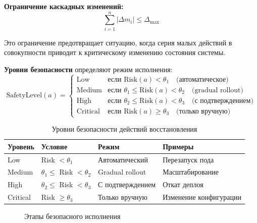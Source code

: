 \textbf{Ограничение каскадных изменений:}
\begin{equation}
\sum_{i=1}^{n} |\Delta m_i| \leq \Delta_{\max}
\label{eq:change_limit}
\end{equation}

Это ограничение предотвращает ситуацию, когда серия малых действий в совокупности приводит к критическому изменению состояния системы.

\textbf{Уровни безопасности} определяют режим исполнения:
\begin{equation}
\text{SafetyLevel}(a) = \begin{cases}
\text{Low} & \text{если } \text{Risk}(a) < \theta_1 \quad \text{(автоматическое)} \\
\text{Medium} & \text{если } \theta_1 \leq \text{Risk}(a) < \theta_2 \quad \text{(gradual rollout)} \\
\text{High} & \text{если } \theta_2 \leq \text{Risk}(a) < \theta_3 \quad \text{(с подтверждением)} \\
\text{Critical} & \text{если } \text{Risk}(a) \geq \theta_3 \quad \text{(только вручную)}
\end{cases}
\label{eq:safety_levels}
\end{equation}

\begin{table}[H]
\centering
\small

\caption{Уровни безопасности действий восстановления}
\label{tab:safety_levels}
\begin{tabular}{|>{\raggedright\arraybackslash}p{2cm}|>{\raggedright\arraybackslash}p{3cm}|>{\raggedright\arraybackslash}p{3cm}|>{\raggedright\arraybackslash}p{2.5cm}|}
\hline
Уровень & Условие & Режим & Примеры \\
\hline
Low & Risk $< \theta_1$ & Автоматический & Перезапуск пода \\
\hline
Medium & $\theta_1 \leq$ Risk $< \theta_2$ & Gradual rollout & Масштабирование \\
\hline
High & $\theta_2 \leq$ Risk $< \theta_3$ & С подтверждением & Откат деплоя \\
\hline
Critical & Risk $\geq \theta_3$ & Только вручную & Изменение конфигурации \\
\hline
\end{tabular}
\end{table}

\begin{figure}[H]
\centering
{}
\caption{Этапы безопасного исполнения}
\label{fig:safe_execution}
\end{figure}


